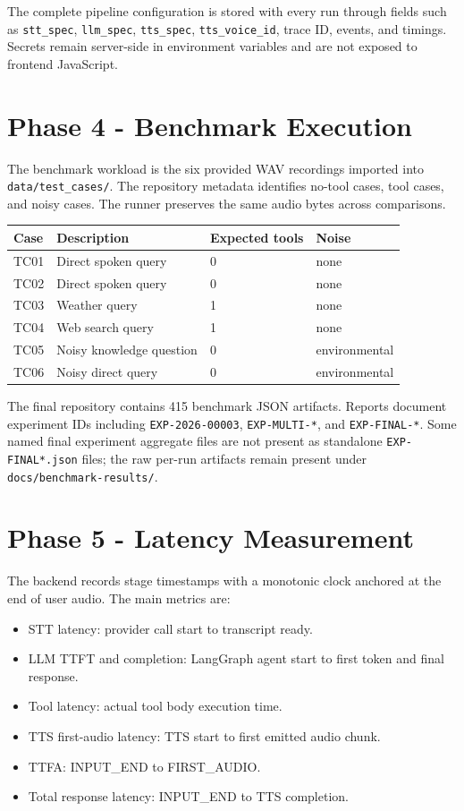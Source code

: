 \documentclass[11pt,a4paper]{article}
\begin{document}
The complete pipeline configuration is stored with every run through fields such
as \texttt{stt\_spec}, \texttt{llm\_spec}, \texttt{tts\_spec},
\texttt{tts\_voice\_id}, trace ID, events, and timings. Secrets remain server-side
in environment variables and are not exposed to frontend JavaScript.

\section{Phase 4 - Benchmark Execution}

The benchmark workload is the six provided WAV recordings imported into
\texttt{data/test\_cases/}. The repository metadata identifies no-tool cases,
tool cases, and noisy cases. The runner preserves the same audio bytes across
comparisons.

\begin{longtable}{p{}p{}p{}p{}}
\toprule
Case & Description & Expected tools & Noise \\
\midrule
TC01 & Direct spoken query & 0 & none \\
TC02 & Direct spoken query & 0 & none \\
TC03 & Weather query & 1 & none \\
TC04 & Web search query & 1 & none \\
TC05 & Noisy knowledge question & 0 & environmental \\
TC06 & Noisy direct query & 0 & environmental \\
\bottomrule
\end{longtable}

The final repository contains 415 benchmark JSON artifacts. Reports document
experiment IDs including \texttt{EXP-2026-00003}, \texttt{EXP-MULTI-*}, and
\texttt{EXP-FINAL-*}. Some named final experiment aggregate files are not present
as standalone \texttt{EXP-FINAL*.json} files; the raw per-run artifacts remain
present under \texttt{docs/benchmark-results/}.

\section{Phase 5 - Latency Measurement}

The backend records stage timestamps with a monotonic clock anchored at the end
of user audio. The main metrics are:

\begin{itemize}
  \item STT latency: provider call start to transcript ready.
  \item LLM TTFT and completion: LangGraph agent start to first token and final response.
  \item Tool latency: actual tool body execution time.
  \item TTS first-audio latency: TTS start to first emitted audio chunk.
  \item TTFA: INPUT\_END to FIRST\_AUDIO.
  \item Total response latency: INPUT\_END to TTS completion.
\end{itemize}
\end{document}
